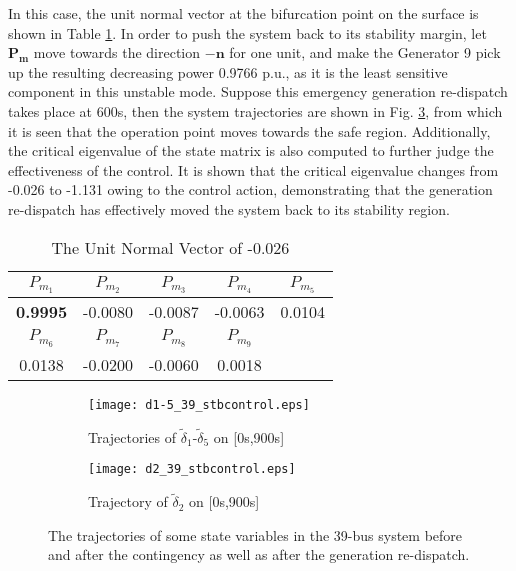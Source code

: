 \documentclass[journal]{IEEEtran}
\begin{document}
In this case, the unit normal vector at the bifurcation point on the surface is shown in Table \ref{39-stbNV}. In order to push the system back to its stability margin, let $\bm{P_m}$ move towards the direction $-{\bm{n}}$ for one unit, and make the Generator 9 pick up the resulting decreasing power 0.9766 p.u., as it is the least sensitive component in this unstable mode. Suppose this emergency generation re-dispatch takes place at 600s, then the system trajectories are shown in Fig. \ref{39-bus-control}, from which it is seen that the operation point moves towards the safe region. Additionally, the critical eigenvalue of the state matrix is also computed to further judge the effectiveness of the control. It is shown that the critical eigenvalue changes from -0.026 to -1.131 owing to the control action, demonstrating that the generation re-dispatch has effectively moved the system back to its stability region.

\begin{table}[!ht]
\centering
\caption{The Unit Normal Vector of -0.026}\label{39-stbNV}
\begin{tabular}{|c|c|c|c|c|}
\hline
$P_{m_1}$& $P_{m_2}$&$P_{m_3}$&$P_{m_4}$&$P_{m_5}$\\
\hline
\textbf{0.9995}&-0.0080&-0.0087&-0.0063& 0.0104\\
\hline
$P_{m_6}$& $P_{m_7}$&$P_{m_8}$&$P_{m_9}$&\\
\hline
0.0138&-0.0200& -0.0060&0.0018&\\
\hline
\end{tabular}
\end{table}

\begin{figure}[!ht]
\centering
\begin{subfigure}[t]{0.52\linewidth}
\texttt{[image: d1-5\_39\_stbcontrol.eps]}
\caption{Trajectories of $\tilde{\delta}_{1}$-$\tilde{\delta}_{5}$ on [0s,900s]}\label{d1-5-39-control}
\end{subfigure}\begin{subfigure}[t]{0.5\linewidth}
\texttt{[image: d2\_39\_stbcontrol.eps]}
\caption{Trajectory of $\tilde{\delta}_{2}$ on [0s,900s]}\label{d2-39-stb-control}
\end{subfigure}
\caption{The trajectories of some state variables in the 39-bus system before and after the contingency as well as after the generation re-dispatch.}\label{39-bus-control}
\end{figure}
\end{document}
